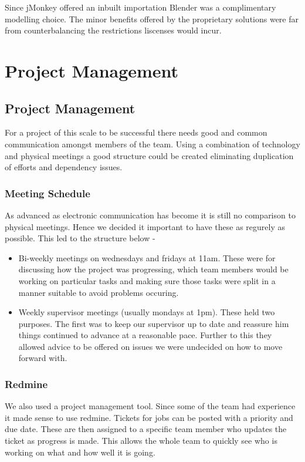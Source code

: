 Since jMonkey offered an inbuilt importation Blender was a complimentary
modelling choice. The minor benefits offered by the proprietary solutions
were far from counterbalancing the restrictions liscenses would incur.


\section*{Project Management}


\subsection*{Project Management}

For a project of this scale to be successful there needs good and
common communication amongst members of the team. Using a combination
of technology and physical meetings a good structure could be created
eliminating duplication of efforts and dependency issues.


\subsubsection*{Meeting Schedule}

As advanced as electronic communication has become it is still no
comparison to physical meetings. Hence we decided it important to
have these as regurely as possible. This led to the structure below
-
\begin{itemize}
\item Bi-weekly meetings on wednesdays and fridays at 11am. These were for
discussing how the project was progressing, which team members would
be working on particular tasks and making sure those tasks were split
in a manner suitable to avoid problems occuring.
\item Weekly supervisor meetings (usually mondays at 1pm). These held two
purposes. The first was to keep our supervisor up to date and reassure
him things continued to advance at a reasonable pace. Further to this
they allowed advice to be offered on issues we were undecided on how
to move forward with.
\end{itemize}

\subsubsection*{Redmine}

We also used a project management tool. Since some of the team had
experience it made sense to use redmine. Tickets for jobs can be posted
with a priority and due date. These are then assigned to a specific
team member who updates the ticket as progress is made. This allows
the whole team to quickly see who is working on what and how well
it is going.


